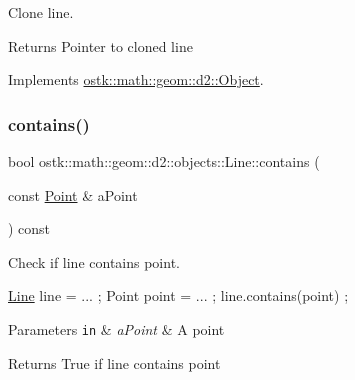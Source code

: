 Clone line. 

\begin{DoxyReturn}{Returns}
Pointer to cloned line 
\end{DoxyReturn}


Implements \hyperlink{classostk_1_1math_1_1geom_1_1d2_1_1_object_a98dedc6792aef35308966ca768eb3e14}{ostk\+::math\+::geom\+::d2\+::\+Object}.

\mbox{\label{classostk_1_1math_1_1geom_1_1d2_1_1objects_1_1_line_aa9569b2e970849c47009a53b1e22dfdb}} 
\subsubsection{\texorpdfstring{contains()}{contains()}\hspace{0.1cm}{\footnotesize\ttfamily [1/2]}}
{\footnotesize\ttfamily bool ostk\+::math\+::geom\+::d2\+::objects\+::\+Line\+::contains (\begin{DoxyParamCaption}\item[{const \hyperlink{classostk_1_1math_1_1geom_1_1d2_1_1objects_1_1_point}{Point} \&}]{a\+Point }\end{DoxyParamCaption}) const}



Check if line contains point. 


\begin{DoxyCode}
\hyperlink{classostk_1_1math_1_1geom_1_1d2_1_1objects_1_1_line_aa1570ebec4d4f57cbed3c188e6b65613}{Line} line = ... ;
Point point = ... ;
line.contains(point) ;
\end{DoxyCode}



\begin{DoxyParams}[1]{Parameters}
\mbox{\tt in}  & {\em a\+Point} & A point \\
\hline
\end{DoxyParams}
\begin{DoxyReturn}{Returns}
True if line contains point 
\end{DoxyReturn}
\mbox{\label{classostk_1_1math_1_1geom_1_1d2_1_1objects_1_1_line_a15a8242575d3a68ddb53640a4c25a48d}} 
